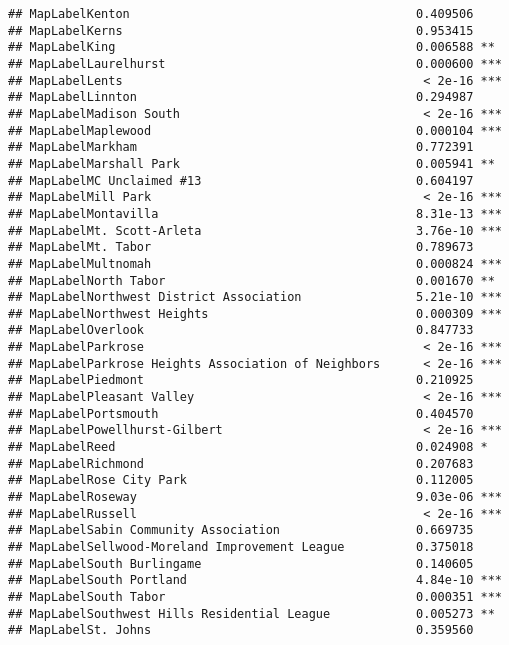 \documentclass[]{article}
\begin{document}
\begin{verbatim}
## MapLabelKenton                                        0.409506    
## MapLabelKerns                                         0.953415    
## MapLabelKing                                          0.006588 ** 
## MapLabelLaurelhurst                                   0.000600 ***
## MapLabelLents                                          < 2e-16 ***
## MapLabelLinnton                                       0.294987    
## MapLabelMadison South                                  < 2e-16 ***
## MapLabelMaplewood                                     0.000104 ***
## MapLabelMarkham                                       0.772391    
## MapLabelMarshall Park                                 0.005941 ** 
## MapLabelMC Unclaimed #13                              0.604197    
## MapLabelMill Park                                      < 2e-16 ***
## MapLabelMontavilla                                    8.31e-13 ***
## MapLabelMt. Scott-Arleta                              3.76e-10 ***
## MapLabelMt. Tabor                                     0.789673    
## MapLabelMultnomah                                     0.000824 ***
## MapLabelNorth Tabor                                   0.001670 ** 
## MapLabelNorthwest District Association                5.21e-10 ***
## MapLabelNorthwest Heights                             0.000309 ***
## MapLabelOverlook                                      0.847733    
## MapLabelParkrose                                       < 2e-16 ***
## MapLabelParkrose Heights Association of Neighbors      < 2e-16 ***
## MapLabelPiedmont                                      0.210925    
## MapLabelPleasant Valley                                < 2e-16 ***
## MapLabelPortsmouth                                    0.404570    
## MapLabelPowellhurst-Gilbert                            < 2e-16 ***
## MapLabelReed                                          0.024908 *  
## MapLabelRichmond                                      0.207683    
## MapLabelRose City Park                                0.112005    
## MapLabelRoseway                                       9.03e-06 ***
## MapLabelRussell                                        < 2e-16 ***
## MapLabelSabin Community Association                   0.669735    
## MapLabelSellwood-Moreland Improvement League          0.375018    
## MapLabelSouth Burlingame                              0.140605    
## MapLabelSouth Portland                                4.84e-10 ***
## MapLabelSouth Tabor                                   0.000351 ***
## MapLabelSouthwest Hills Residential League            0.005273 ** 
## MapLabelSt. Johns                                     0.359560    

\end{verbatim}
\end{document}
